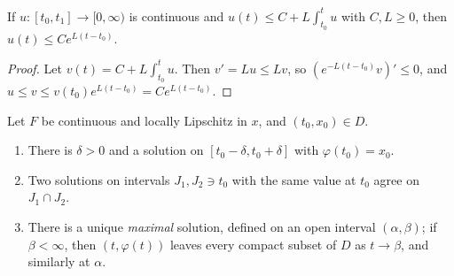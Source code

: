 \begin{lemma}[Gr\"onwall]\label{real-analysis:lemma-gronwall}
If $u \colon [t_0, t_1] \to [0, \infty)$ is continuous and $u(t) \leq C + L\int_{t_0}^tu$ with $C, L \geq 0$, then $u(t) \leq Ce^{L(t - t_0)}$.
\end{lemma}

\begin{proof}
Let $v(t) = C + L\int_{t_0}^tu$. Then $v' = Lu \leq Lv$, so $(e^{-L(t - t_0)}v)' \leq 0$, and $u \leq v \leq v(t_0)e^{L(t - t_0)} = Ce^{L(t - t_0)}$.
\end{proof}

\begin{theorem}\label{real-analysis:theorem-picard-lindelof}
Let $F$ be continuous and locally Lipschitz in $x$, and $(t_0, x_0) \in D$.
\begin{enumerate}
\item There is $\delta > 0$ and a solution on $[t_0 - \delta, t_0 + \delta]$ with $\varphi(t_0) = x_0$.
\item Two solutions on intervals $J_1, J_2 \ni t_0$ with the same value at $t_0$ agree on $J_1 \cap J_2$.
\item There is a unique \emph{maximal} solution, defined on an open interval $(\alpha, \beta)$; if $\beta < \infty$, then $(t, \varphi(t))$ leaves every compact subset of $D$ as $t \to \beta$, and similarly at $\alpha$.
\end{enumerate}
\end{theorem}

